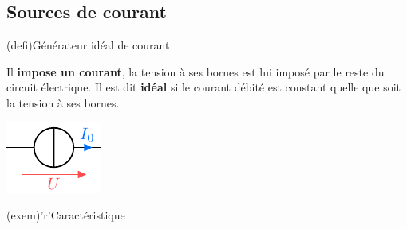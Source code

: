 \documentclass[../../main/main.tex]{subfiles}
\begin{document}
\subsection{Sources de courant}

\begin{tcbraster}[raster columns=2, raster equal height=rows]
	\begin{tcb}[label=def:gentens](defi){Générateur idéal de courant}
		\begin{isd}
			Il \textbf{impose un courant}, la tension à ses bornes
			est lui imposé par le reste du circuit électrique.
			\tcblower
			Il est dit \textbf{idéal} si le courant débité est constant quelle que
			soit la tension à ses bornes.
		\end{isd}
		\begin{center}
			\includegraphics[width=.4\linewidth]{gcourg}
		\end{center}
	\end{tcb}
	\begin{tcb}[label=exem:gentens](exem)'r'{Caractéristique}
		\begin{center}
\end{center}
\end{tcb}
\end{tcbraster}
\end{document}

